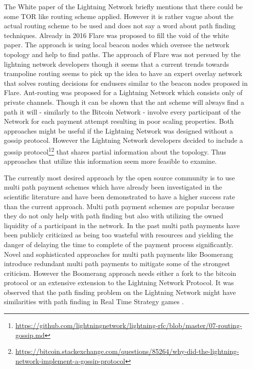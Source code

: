 \documentclass[a4paper]{paper}
\begin{document}
The White paper of the Lightning Network \cite{poon2016bitcoin} briefly mentions that there could be some TOR like routing scheme applied.
However it is rather vague about the actual routing scheme to be used and does not say a word about path finding techniques.
Already in 2016 Flare \cite{prihodko2016flare} was proposed to fill the void of the white paper.
The approach is using local beacon nodes which oversee the network topology and help to find paths.
The approach of Flare was not persued by the lightning network developers though it seems that a current trends towards trampoline routing\cite{Teinturier2019trampoline} seems to pick up the idea to have an expert overlay network that solves routing decisions for endusers similar to the beacon nodes proposed in Flare.
Ant-routing \cite{grunspan2018ant} was proposed for a Lightning Network which consists only of private channels.
Though it can be shown that the ant scheme will always find a path it will - similarly to the Bitcoin Network - involve every participant of the Network for each payment attempt resulting in poor scaling properties.
Both approaches might be useful if the Lightning Network was designed without a gossip protocol.
However the Lightning Network developers decided to include a gossip protocol\footnote{\url{https://github.com/lightningnetwork/lightning-rfc/blob/master/07-routing-gossip.md}}\footnote{\url{https://bitcoin.stackexchange.com/questions/85264/why-did-the-lightning-network-implement-a-gossip-protocol}} that shares partial information about the topology.
Thus approaches that utilize this information seem more feasible to examine.

The currently most desired approach by the open source community is to use multi path payment schemes \cite{osuntokun2018AMP} which have already been investigated \cite{piatkivskyi2018split} in the scientific literature and have been demonstrated to have a higher success rate than the current approach.
Multi path payment schemes are popular because they do not only help with path finding but also with utilizing the owned liquidity of a participant in the network.
In the past multi path payments have been publicly criticized \cite{pickhardt2019pathfinding} as being too wasteful with resources and yielding the danger of delaying the time to complete of the payment process significantly.
Novel and sophisticated approaches for multi path payments like Boomerang \cite{bagaria2019boomerang} introduce redundant multi path payments to mitigate some of the strongest criticism.
However the Boomerang approach needs either a fork to the bitcoin protocol or an extensive extension to the Lightning Network Protocol. 
It was observed that the path finding problem on the Lightning Network might have similarities with path finding in Real Time Strategy games \cite{zmnscpxj2019rts}.
\end{document}

